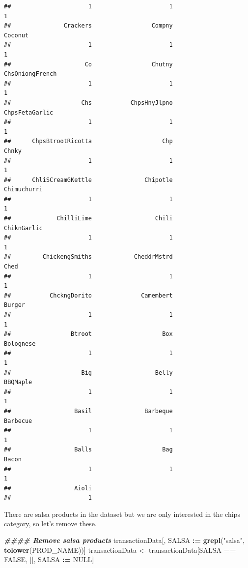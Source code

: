 \documentclass[
]{article}
\newenvironment{Shaded}{\begin{snugshade}}{\end{snugshade}}
\newcommand{\ConstantTok}[1]{\textcolor[rgb]{0.56,0.35,0.01}{#1}}
\newcommand{\DocumentationTok}[1]{\textcolor[rgb]{0.56,0.35,0.01}{\textbf{\textit{#1}}}}
\newcommand{\FunctionTok}[1]{\textcolor[rgb]{0.13,0.29,0.53}{\textbf{#1}}}
\newcommand{\NormalTok}[1]{#1}
\newcommand{\OtherTok}[1]{\textcolor[rgb]{0.56,0.35,0.01}{#1}}
\newcommand{\SpecialCharTok}[1]{\textcolor[rgb]{0.81,0.36,0.00}{\textbf{#1}}}
\newcommand{\StringTok}[1]{\textcolor[rgb]{0.31,0.60,0.02}{#1}}
\begin{document}
\begin{verbatim}
##                      1                      1                      1 
##               Crackers                 Compny                Coconut 
##                      1                      1                      1 
##                     Co                 Chutny        ChsOniongFrench 
##                      1                      1                      1 
##                    Chs           ChpsHnyJlpno         ChpsFetaGarlic 
##                      1                      1                      1 
##      ChpsBtrootRicotta                    Chp                  Chnky 
##                      1                      1                      1 
##      ChliSCreamGKettle               Chipotle            Chimuchurri 
##                      1                      1                      1 
##             ChilliLime                  Chili            ChiknGarlic 
##                      1                      1                      1 
##         ChickengSmiths            CheddrMstrd                   Ched 
##                      1                      1                      1 
##           ChckngDorito              Camembert                 Burger 
##                      1                      1                      1 
##                 Btroot                    Box              Bolognese 
##                      1                      1                      1 
##                    Big                  Belly               BBQMaple 
##                      1                      1                      1 
##                  Basil               Barbeque               Barbecue 
##                      1                      1                      1 
##                  Balls                    Bag                  Bacon 
##                      1                      1                      1 
##                  Aioli 
##                      1
\end{verbatim}

There are salsa products in the dataset but we are only interested in
the chips category, so let's remove these.

\begin{Shaded}
\begin{Highlighting}[]
\DocumentationTok{\#\#\#\# Remove salsa products}
\NormalTok{transactionData[, SALSA }\SpecialCharTok{:=} \FunctionTok{grepl}\NormalTok{(}\StringTok{"salsa"}\NormalTok{, }\FunctionTok{tolower}\NormalTok{(PROD\_NAME))]}
\NormalTok{transactionData }\OtherTok{\textless{}{-}}\NormalTok{ transactionData[SALSA }\SpecialCharTok{==} \ConstantTok{FALSE}\NormalTok{, ][, SALSA }\SpecialCharTok{:=} \ConstantTok{NULL}\NormalTok{]}
\end{Highlighting}
\end{Shaded}
\end{document}
